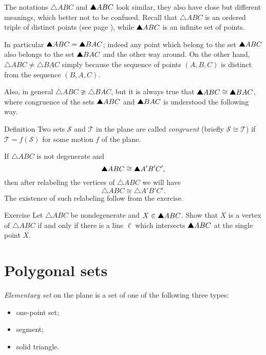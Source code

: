 The notations $\triangle ABC$ and $\solidtriangle ABC$ look similar,
they also have close but different meanings, 
which better not to be confused.
Recall that $\triangle ABC$ is an ordered triple of distinct points
(see page \pageref{page:def:triangle}),
while $\solidtriangle ABC$ is an infinite set of points.

In particular $\solidtriangle ABC=\solidtriangle BAC$; indeed any point which belong to the set $\solidtriangle ABC$ 
also belongs to the set $\solidtriangle BAC$
and the other way around.
On the other hand,
$\triangle ABC\ne\triangle BAC$ simply because the sequence of points $(A,B,C)$ is distinct from the sequence $(B,A,C)$.

Also, in general  $\triangle ABC\ncong\triangle BAC$, but it is always true that $\solidtriangle ABC\cong\solidtriangle BAC$, where congruence of the sets $\solidtriangle ABC$ and $\solidtriangle BAC$ 
is understood the following way.

\begin{thm}{Definition}\label{def:cong-sets}
Two sets $\mathcal{S}$ and $\mathcal{T}$ in the plane  
are called \emph{congruent} 
(briefly $\mathcal{S}\cong \mathcal{T}$)
if 
$\mathcal{T}=f(\mathcal{S})$ for some motion $f$ of the plane.
\end{thm}

If $\triangle ABC$ is not degenerate
and \[\solidtriangle ABC\cong \solidtriangle A'B'C',\]
then after relabeling the vertices of $\triangle ABC$ 
we will have 
\[\triangle ABC\cong \triangle A'B'C'.\]
The existence of such relabeling follow from the exercise.

\begin{thm}{Exercise}\label{ex:vertex}
Let $\triangle ABC$ be nondegenerate and $X\z\in \solidtriangle ABC$.
Show that $X$ is a vertex of $\triangle ABC$
if and only if there is a line $\ell$ which intersects $\solidtriangle ABC$
at the single point $X$.
\end{thm}

\section*{Polygonal sets}

\emph{Elementary set} on the plane 
is a set of one of the following three types:
\begin{itemize}
 \item one-point set;
 \item segment;
 \item solid triangle.
\end{itemize}

